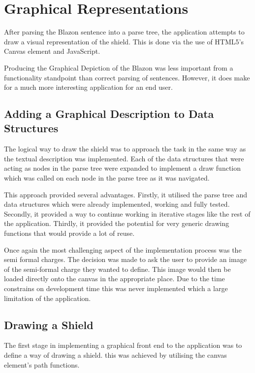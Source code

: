 \chapter{Graphical Representations} 

After parsing the Blazon sentence into a parse tree, the application attempts to draw a visual representation of the shield.  This is done via the use of HTML5's Canvas element and JavaScript.  

Producing the Graphical Depiction of the Blazon was less important from a  functionality standpoint than correct parsing of sentences.  However, it does make for a much more interesting application for an end user.  


\section{Adding a Graphical Description to Data Structures}
The logical way to draw the shield was to approach the task in the same way as the textual description was implemented.  Each of the data structures that were acting as nodes in the parse tree were expanded to implement a draw function which was called on each node in the parse tree as it was navigated. 


This approach provided several advantages.  Firstly, it utilised the parse tree and data structures which were already implemented, working and fully tested.  Secondly, it provided a way to continue working in iterative stages like the rest of the application. Thirdly, it provided the potential for very generic drawing functions that would provide a lot of reuse.


Once again the most challenging aspect of the implementation process was the semi formal charges.  The decision was made to ask the user to provide an image of the semi-formal charge they wanted to define.  This image would then be loaded directly onto the canvas in the appropriate place.  Due to the time constrains on development time this was never implemented which a large limitation of the application.




\section{Drawing a Shield}

The first stage in implementing a graphical front end to the application was to define a way of drawing a shield.  this was achieved by utilising the canvas element's path functions.  


